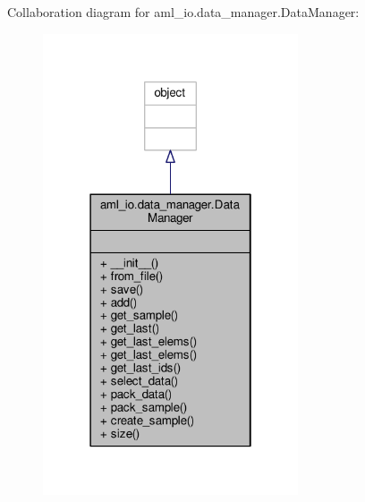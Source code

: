 Collaboration diagram for aml\-\_\-io.\-data\-\_\-manager.\-Data\-Manager\-:\nopagebreak
\begin{figure}[H]
\begin{center}
\leavevmode
\includegraphics[width=214pt]{classaml__io_1_1data__manager_1_1_data_manager__coll__graph}
\end{center}
\end{figure}
